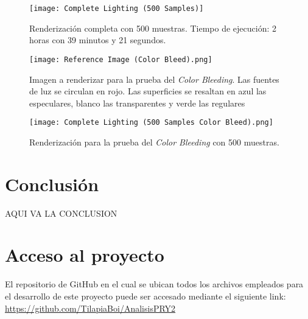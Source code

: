 \documentclass[conference]{IEEEtran}
\begin{document}
\begin{figure}[htbp]
\centerline{\texttt{[image: Complete Lighting (500 Samples)]}}
\caption{Renderización completa con 500 muestras. Tiempo de ejecución: 2 horas con 39 minutos y 21 segundos.}
\label{500 muestras completo}
\end{figure}

\begin{figure}[htbp]
\centerline{\texttt{[image: Reference Image (Color Bleed).png]}}
\caption{Imagen a renderizar para la prueba del \textit{Color Bleeding}. Las fuentes de luz se circulan en rojo. Las superficies se resaltan en azul las especulares, blanco las transparentes y verde las regulares}
\label{Imagen de referencia color bleeding}
\end{figure}

\begin{figure}[htbp]
\centerline{\texttt{[image: Complete Lighting (500 Samples Color Bleed).png]}}
\caption{Renderización para la prueba del \textit{Color Bleeding} con 500 muestras.}
\label{500 muestras color bleeding.}
\end{figure}
\section{Conclusión}

AQUI VA LA CONCLUSION

\section{Acceso al proyecto}
El repositorio de GitHub en el cual se ubican todos los archivos empleados para el desarrollo de este proyecto puede ser accesado mediante el siguiente link: \url{https://github.com/TilapiaBoi/AnalisisPRY2}
\end{document}
